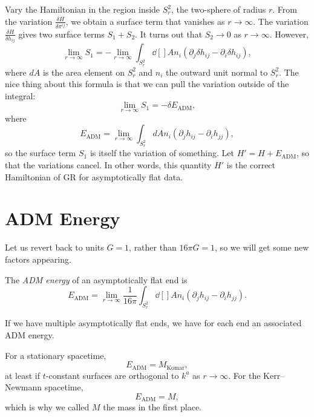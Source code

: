 Vary the Hamiltonian in the region inside $S^2_r$, the two-sphere of radius $r$.
From the variation $ \frac{\delta H}{\delta \pi^{ij}} $, we obtain a surface term that vanishes as $r \to \infty$.
The variation $\frac{\delta H}{\delta h_{ij}}$ gives two surface terms $S_1 + S_2$. It turns out that $S_2 \to 0$ as $r \to \infty$.
However,
\begin{equation}
  \lim_{r \to \infty} S_1  =- \lim_{r \to \infty}   \int_{S_r^2} \dd[]{A} n_i (\partial_j \delta h_{ij} - \partial_{i} \delta h_{ij}),
\end{equation}
where $dA$ is the area element on $S^2_r$ and $n_i$ the outward unit normal to $S_r^2$.
The nice thing about this formula is that we can pull the variation outside of the integral:
\begin{equation}
  \lim_{r \to \infty} S_1 = - \delta E_{\text{ADM}},
\end{equation}
where
\begin{equation}
  E_{\text{ADM}} = \lim_{r \to \infty} \int_{S_r^2}  dA n_i (\partial_j h_{ij} - \partial_i h_{jj}),
\end{equation}
so the surface term $S_1$ is itself the variation of something.
Let $H' = H + E_{\text{ADM}}$, so that the variations cancel.
In other words, this quantity $H'$ is the correct Hamiltonian of GR for asymptotically flat data.

\section{ADM Energy}%
\label{sec:adm_energy}

Let us revert back to units $G = 1$, rather than $16 \pi G = 1$, so we will get some new factors appearing.
\begin{definition}
  The \emph{ADM energy} of an asymptotically flat end is
  \begin{equation}
    E_{\text{ADM}} = \lim_{r \to \infty} \frac{1}{16 \pi} \int_{S_r^2} \dd[]{A} n_i (\partial_j h_{ij} - \partial_{i} h_{jj}).
  \end{equation}
\end{definition}
If we have multiple asymptotically flat ends, we have for each end an associated ADM energy.

For a stationary spacetime,
\begin{equation}
  E_{\text{ADM}} = M_{\text{Komar}},
\end{equation}
at least if $t$-constant surfaces are orthogonal to $k^{a}$ as $r \to \infty$.
For the Kerr--Newmann spacetime,
\begin{equation}
  E_{\text{ADM}} = M,
\end{equation}
which is why we called $M$ the mass in the first place.

